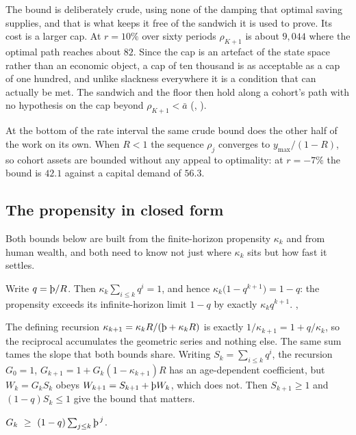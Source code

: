 The bound is deliberately crude, using none of the damping that optimal saving supplies, and that
is what keeps it free of the sandwich it is used to prove. Its cost is a larger cap. At $r=10\%$
over sixty periods $\rho_{K+1}$ is about $9{,}044$ where the optimal path reaches about $82$.
Since the cap is an artefact of the state space rather than an economic object, a cap of ten
thousand is as acceptable as a cap of one hundred, and unlike slackness everywhere it is a
condition that can actually be met. The sandwich and the floor then hold along a cohort's path
with no hypothesis on the cap beyond $\rho_{K+1}<\bar a$
(, ).

At the bottom of the rate interval the same crude bound does the other half of the work on its
own. When $R<1$ the sequence $\rho_j$ converges to $y_{\max}/(1-R)$, so cohort assets are bounded
without any appeal to optimality: at $r=-7\%$ the bound is $42.1$ against a capital demand of
$56.3$.

\subsection{The propensity in closed form}\label{sec:geom}

Both bounds below are built from the finite-horizon propensity $\kappa_k$ and from human wealth,
and both need to know not just where $\kappa_k$ sits but how fast it settles.

\begin{proposition}\label{prop:kappa}
Write $q=\Thorn/R$. Then $\kappa_k\sum_{i\le k}q^i=1$, and hence
$\kappa_k\bigl(1-q^{k+1}\bigr)=1-q$: the propensity exceeds its infinite-horizon limit $1-q$ by
exactly $\kappa_kq^{k+1}$.
,
\end{proposition}

The defining recursion $\kappa_{k+1}=\kappa_kR/(\Thorn+\kappa_kR)$ is exactly
$1/\kappa_{k+1}=1+q/\kappa_k$, so the reciprocal accumulates the geometric series and nothing
else. The same sum tames the slope that both bounds share. Writing $S_k=\sum_{i\le k}q^i$, the
recursion $G_0=1$, $G_{k+1}=1+G_k(1-\kappa_{k+1})R$ has an age-dependent coefficient, but
$W_k=G_kS_k$ obeys $W_{k+1}=S_{k+1}+\Thorn W_k$, which does not. Then $S_{k+1}\ge1$ and
$(1-q)S_k\le1$ give the bound that matters.

\begin{proposition}\label{prop:slope}
$G_k\ \ge\ (1-q)\sum_{j\le k}\Thorn^{\,j}$.
\end{proposition}

